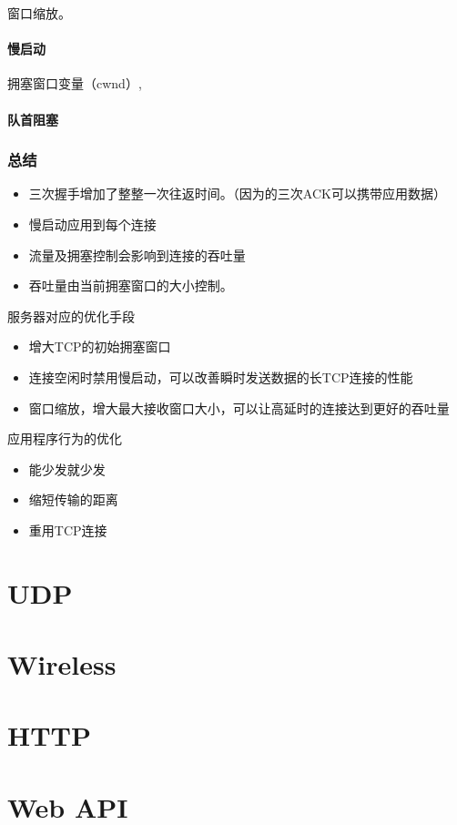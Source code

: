 窗口缩放。

\paragraph{慢启动}

拥塞窗口变量（cwnd）,

\paragraph{队首阻塞}


\subsubsection{总结}

\begin{itemize}
\item 三次握手增加了整整一次往返时间。（因为的三次ACK可以携带应用数据）
\item 慢启动应用到每个连接
\item 流量及拥塞控制会影响到连接的吞吐量
\item 吞吐量由当前拥塞窗口的大小控制。
\end{itemize}

服务器对应的优化手段
\begin{itemize}
\item 增大TCP的初始拥塞窗口

\item 连接空闲时禁用慢启动，可以改善瞬时发送数据的长TCP连接的性能
\item 窗口缩放，增大最大接收窗口大小，可以让高延时的连接达到更好的吞吐量

\end{itemize}

应用程序行为的优化
\begin{itemize}
\item 能少发就少发
\item 缩短传输的距离
\item 重用TCP连接
\end{itemize}

\section{UDP}

\section{Wireless}

\section{HTTP}

\section{Web API}